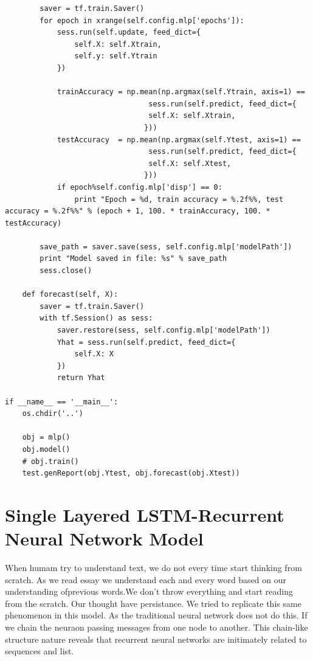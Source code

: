 \documentclass[BTech]{srmuthesis}
\begin{document}
\begin{verbatim}
        saver = tf.train.Saver()
        for epoch in xrange(self.config.mlp['epochs']):
            sess.run(self.update, feed_dict={
                self.X: self.Xtrain,
                self.y: self.Ytrain
            })

            trainAccuracy = np.mean(np.argmax(self.Ytrain, axis=1) ==
                                 sess.run(self.predict, feed_dict={
                                 self.X: self.Xtrain,
                                }))
            testAccuracy  = np.mean(np.argmax(self.Ytest, axis=1) ==
                                 sess.run(self.predict, feed_dict={
                                 self.X: self.Xtest,
                                }))
            if epoch%self.config.mlp['disp'] == 0:
                print "Epoch = %d, train accuracy = %.2f%%, test accuracy = %.2f%%" % (epoch + 1, 100. * trainAccuracy, 100. * testAccuracy)

        save_path = saver.save(sess, self.config.mlp['modelPath'])
        print "Model saved in file: %s" % save_path
        sess.close()

    def forecast(self, X):
        saver = tf.train.Saver()
        with tf.Session() as sess:
            saver.restore(sess, self.config.mlp['modelPath'])
            Yhat = sess.run(self.predict, feed_dict={
                self.X: X
            })
            return Yhat

if __name__ == '__main__':
    os.chdir('..')

    obj = mlp()
    obj.model()
    # obj.train()
    test.genReport(obj.Ytest, obj.forecast(obj.Xtest))

\end{verbatim}

\chapter{Single Layered LSTM-Recurrent Neural Network Model}

When humam try to understand text, we do not every time start thinking from scratch. As we read essay we understand each and every word based on our understanding ofprevious words.We don't throw everything and start reading from the scratch. Our thought have persistance. 
We tried to replicate this same phenomenon in this model. As the traditional neural network does not do this. If we chain the neuraon passing messages from one node to another. This chain-like structure nature reveals that recurrent neural networks are initimately related to sequences and list.  
\end{document}

